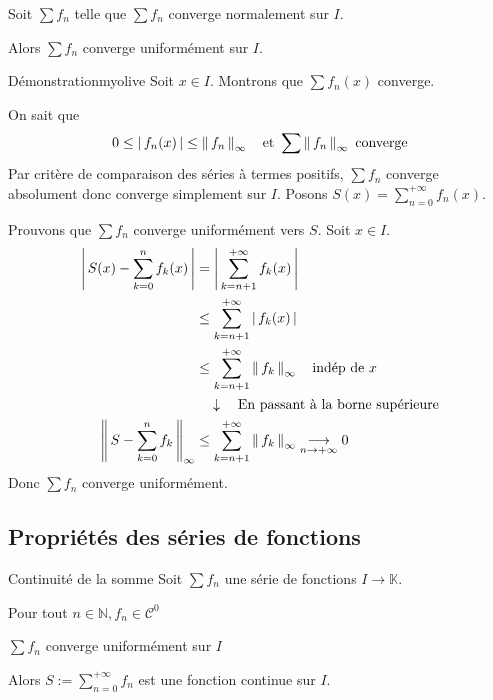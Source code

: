     \begin{prop}{}{}
        Soit $\sum f_n$ telle que $\sum f_n$ converge normalement sur $I$.

        Alors $\sum f_n$ converge uniformément sur $I$.
    \end{prop}

    \begin{demo}{Démonstration}{myolive}
        Soit $x \in I$. Montrons que $\sum f_n(x)$ converge. 

        On sait que 
        \[ 0 \leq \left\lvert \,f_n(x) \, \right\rvert \leq \left\lVert\,f_n\,\right\rVert_{\infty} \quad \text{et } \sum \left\lVert\,f_n\,\right\rVert_{\infty} \text{ converge} \] 
        Par critère de comparaison des séries à termes positifs, $\sum f_n$ converge absolument donc converge simplement sur $I$. Posons $S(x) = \sum_{n=0}^{+\infty} f_n(x)$. 

        Prouvons que $\sum f_n$ converge uniformément vers $S$. Soit $x \in I$.
        \begin{align*}
            \left\lvert \,S(x) - \sum_{k=0}^{n} f_k(x) \, \right\rvert 
            &= \left\lvert \,\sum_{k=n+1}^{+\infty} f_k(x) \, \right\rvert \\
            &\leq \sum_{k=n+1}^{+\infty} \left\lvert \,f_k(x) \, \right\rvert \\
            &\leq \sum_{k=n+1}^{+\infty} \left\lVert\,f_k\,\right\rVert_{\infty} \quad \text{indép de } x \\
            & \quad \downarrow \quad \text{En passant à la borne supérieure} \\
            \left\lVert\,S - \sum_{k=0}^{n} f_k\,\right\rVert_{\infty} 
            &\leq \sum_{k=n+1}^{+\infty} \left\lVert\,f_k\,\right\rVert_{\infty} \underset{n \rightarrow +\infty}{\longrightarrow} 0
        \end{align*}
        Donc $\sum f_n$ converge uniformément.
    \end{demo}

\subsection{Propriétés des séries de fonctions}

    \begin{prop}{Continuité de la somme}{}
        Soit $\sum f_n$ une série de fonctions $I \rightarrow \mathbb{K}$. 
        \begin{suppose}
            \item Pour tout $n \in \mathbb{N}, f_n \in \mathcal{C}^0$
            \item $\sum f_n$ converge uniformément sur $I$
        \end{suppose}
        Alors $S := \sum_{n=0}^{+\infty} f_n$ est une fonction continue sur $I$.
    \end{prop}

